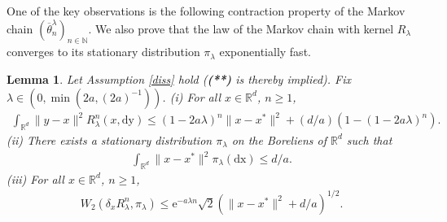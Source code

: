 \documentclass[a4paper]{article}
\newtheorem{lemma}[theorem]{Lemma}
\def\e{\text{e}}
\def\Rl{R_{\lambda}}
\def\Rd{\mathbb{R}^d}
\begin{document}
One of the key observations is the following contraction property
of the Markov chain $(\overline{\theta}^{\lambda}_n)_{n\in\mathbb{N}}$. We also prove that the law of the Markov chain with kernel $R_{\lambda}$ converges to its stationary distribution $\pi_{\lambda}$ exponentially fast.

\begin{lemma}\label{prop4}
Let Assumption \ref{diss} hold ({\bf (**)} is thereby implied). Fix $\lambda \in (0,\min(2a,(2a)^{-1}))$.
	(i) For all $x \in \Rd$, $n \geq 1$,
	\begin{align*}
	\int_{\Rd}\|y-x\|^2R_{\lambda}^n(x,\mathrm{dy})\leq (1-2a\lambda)^{n}\|x-x^*\|^2+(d/a)(1-(1-2a\lambda)^n).
	\end{align*}
	(ii)  There exists a stationary distribution $\pi_{\lambda}$ on the Boreliens of $\mathbb{R}^d$ such that
	\begin{align*}
	\int_{\Rd}\|x-x^*\|^2\pi_{\lambda}(\mathrm{dx}) \leq d/a.
	\end{align*}
(iii) For all $x \in \Rd$, $n \geq 1$,
\begin{align*}
W_2(\delta_x \Rl^n, \pi_{\lambda})\leq \e^{-a\lambda n}\sqrt{2}( \|x-x^*\|^2+d/a)^{1/2}.
\end{align*}
\end{lemma}
\end{document}
